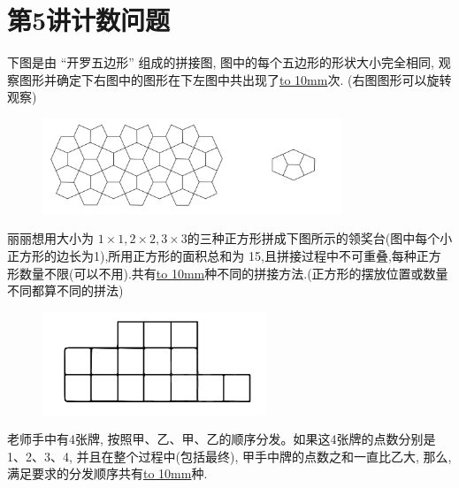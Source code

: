 \section{第5讲\quad 计数问题}

\item {
    下图是由 ``开罗五边形'' 组成的拼接图, 图中的每个五边形的形状大小完全相同, 观察图形并确定下右图中的图形在下左图中共出现了\underline{\hbox to 10mm{}}次. (右图图形可以旋转观察)
    \begin{figure}[H] 
        \centering
        \includegraphics[width=0.8\textwidth]{./pics/Chapter_6/8.png}
    \end{figure}
}

\item {丽丽想用大小为 $1\times 1, 2\times 2, 3\times 3$的三种正方形拼成下图所示的领奖台(图中每个小正方形的边长为1),所用正方形的面积总和为 15,且拼接过程中不可重叠,每种正方形数量不限(可以不用).共有\underline{\hbox to 10mm{}}种不同的拼接方法.(正方形的摆放位置或数量不同都算不同的拼法)
    \begin{figure}[H] 
        \centering
        \includegraphics[width=0.6\textwidth]{./pics/Chapter_6/9.png}
    \end{figure}
}

\item {老师手中有4张牌, 按照甲、乙、甲、乙的顺序分发。如果这4张牌的点数分别是 1、2、3、4, 并且在整个过程中(包括最终), 甲手中牌的点数之和一直比乙大, 那么, 满足要求的分发顺序共有\underline{\hbox to 10mm{}}种.
}

